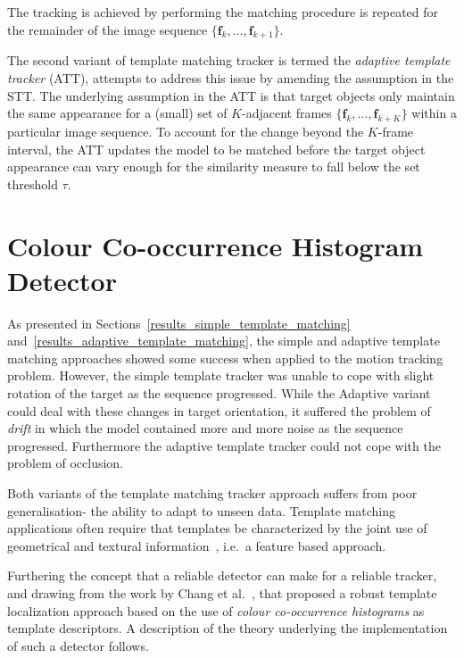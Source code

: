 The tracking is achieved by performing the matching procedure is repeated for
the remainder of the image sequence $\{\mathbf{f}_k,\ldots,\mathbf{f}_{k+1}\}$.

The second variant of template matching tracker is termed the \textit{adaptive
template tracker} (ATT), attempts to address this issue by amending the
assumption in the STT\@. The underlying assumption in the ATT is that target
objects only maintain the same appearance for a (small) set of $K$-adjacent
frames $\{\mathbf{f}_k,\ldots, \mathbf{f}_{k+K}\}$ within a particular image
sequence. To account for the change beyond the $K$-frame interval, the ATT
updates the model to be matched before the target object appearance can vary
enough for the similarity measure to fall below the set threshold $\tau$.


\section{Colour Co-occurrence Histogram Detector}\label{theoretical_framework_ch}
As presented in Sections~\ref{results_simple_template_matching} and~\ref{results_adaptive_template_matching}, 
the simple and adaptive template matching
approaches showed some success when applied to the motion
tracking problem. However, the simple template tracker was unable to cope with
slight rotation of the target as the sequence progressed.
While the Adaptive variant could deal with these changes in target
orientation, it suffered the problem of \textit{drift} in which the model contained
more and more noise as the sequence progressed.
Furthermore the adaptive template tracker could not cope with the problem of
occlusion.

Both variants of the template matching tracker approach suffers from poor generalisation- the
ability to adapt to unseen data. Template matching applications often require
that templates be characterized by the joint use of geometrical and textural
information~\cite{Brunelli}, i.e.\ a feature based approach.

Furthering the concept that a reliable detector can make for a reliable
tracker, and drawing from the work by Chang et al.~\cite{Chang1999}, that proposed a
robust template localization approach based on the use of \textit{colour co-occurrence
histograms} as template descriptors. A description of the theory underlying the
implementation of such a detector follows.

